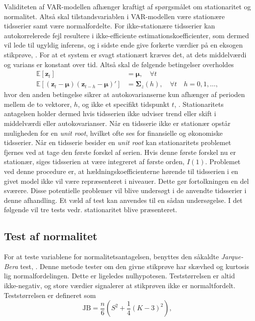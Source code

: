 \documentclass[
  a4paper,
  oneside]{memoir}
\begin{document}
Validiteten af VAR-modellen afhænger kraftigt af spørgsmålet om stationaritet og normalitet. Altså skal tilstandsvariablen i VAR-modellen være stationære tidsserier samt være normalfordelte. For ikke-stationære tidsserier kan autokorrelerede fejl resultere i ikke-efficiente estimationskoefficienter, som dermed vil lede til ugyldig inferens, og i sidste ende give forkerte værdier på en eksogen stikprøve, \citep{Granger1974}. For at et system er svagt stationært kræves det, at dets middelværdi og varians er konstant over tid. Altså skal de følgende betingelser overholdes
\begin{align*}
\mathbb{E}\left[\bm{z}_t\right]&=\bm{\mu},\quad\forall t\\
\mathbb{E}\left[(\bm{z}_t-\bm{\mu}) (\bm{z}_{t-h}-\bm{\mu})'\right]&=\bm{\Sigma}_z(h),\quad \forall t\quad h=0,1,\dots,
\end{align*}
hvor den anden betingelse sikrer at autokovarianserne kun afhænger af perioden mellem de to vektorer, \(h\), og ikke et specifikt tidspunkt \(t\), \citep{Lutkepohl2005}. Stationaritets antagelsen holder dermed hvis tidsserien ikke udviser trend eller skift i middelværdi eller autokovarianser. Når en tidsserie ikke er stationær opstår muligheden for en \emph{unit root}, hvilket ofte ses for finansielle og økonomiske tidsserier. Når en tidsserie besider en \emph{unit root} kan stationaritets problemet fjernes ved at tage den første forskel af serien. Hvis denne første forskel nu er stationær, siges tidsserien at være integreret af første orden, \(I(1)\). Problemet ved denne procedure er, at hældningskoefficienterne hørende til tidsserien i en givet model ikke vil være repræsenteret i niveauer. Dette gør fortolkningen en del sværere. Disse potentielle problemer vil blive undersøgt i de anvendte tidsserier i denne afhandling. Et væld af test kan anvendes til en sådan undersøgelse. I det følgende vil tre tests vedr. stationaritet blive præsenteret.

\hypertarget{test-af-normalitet}{%
\subsection{Test af normalitet}\label{test-af-normalitet}}

For at teste variablene for normalitetsantagelsen, benyttes den såkaldte \emph{Jarque-Bera} test, \citep{Jarque1980}. Denne metode tester om den givne stikprøve har skævhed og kurtosis lig normalfordelingen. Dette er ligeledes nulhypotesen. Teststørrelsen er altid ikke-negativ, og store værdier signalerer at stikprøven ikke er normaltfordelt. Teststørrelsen er defineret som
\[\text{JB}=\frac{n}{6}\left(S^2+\frac{1}{4}(K-3)^2\right),\]
\end{document}
